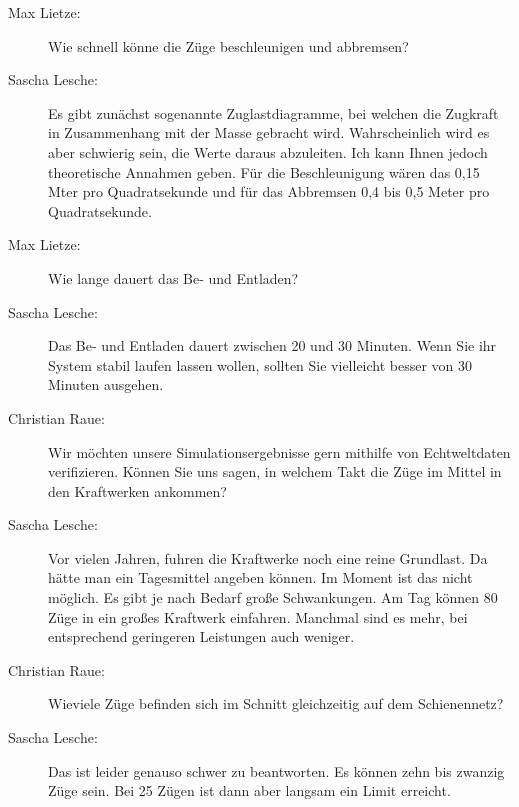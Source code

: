 \begin{description}
    \item[Max Lietze:] Wie schnell könne die Züge beschleunigen und abbremsen?

    \item[Sascha Lesche:] Es gibt zunächst sogenannte Zuglastdiagramme, bei welchen die Zugkraft in Zusammenhang mit der Masse gebracht wird. Wahrscheinlich wird es aber schwierig sein, die Werte daraus abzuleiten. Ich kann Ihnen jedoch theoretische Annahmen geben. Für die Beschleunigung wären das 0,15 Mter pro Quadratsekunde und für das Abbremsen 0,4 bis 0,5 Meter pro Quadratsekunde.

    \item[Max Lietze:] Wie lange dauert das Be- und Entladen?

    \item[Sascha Lesche:] Das Be- und Entladen dauert zwischen 20 und 30 Minuten. Wenn Sie ihr System stabil laufen lassen wollen, sollten Sie vielleicht besser von 30 Minuten ausgehen. 

    \item[Christian Raue:] Wir möchten unsere Simulationsergebnisse gern mithilfe von Echtweltdaten verifizieren. Können Sie uns sagen, in welchem Takt die Züge im Mittel in den Kraftwerken ankommen?

    \item[Sascha Lesche:] Vor vielen Jahren, fuhren die Kraftwerke noch eine reine Grundlast. Da hätte man ein Tagesmittel angeben können. Im Moment ist das nicht möglich. Es gibt je nach Bedarf große Schwankungen. Am Tag können 80 Züge in ein großes Kraftwerk einfahren. Manchmal sind es mehr, bei entsprechend geringeren Leistungen auch weniger.

    \item[Christian Raue:] Wieviele Züge befinden sich im Schnitt gleichzeitig auf dem Schienennetz?

    \item[Sascha Lesche:] Das ist leider genauso schwer zu beantworten. Es können zehn bis zwanzig Züge sein. Bei 25 Zügen ist dann aber langsam ein Limit erreicht.
	
\end{description}
